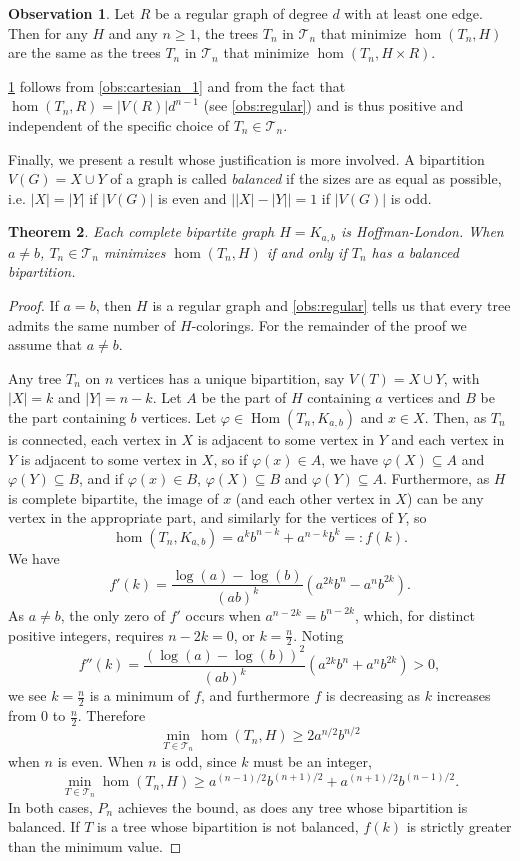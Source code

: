 \documentclass[11pt]{article}
\newtheorem{theorem}{Theorem}[section]
\theoremstyle{definition}
\newtheorem{observation}[theorem]{Observation}
\DeclareMathOperator{\Hom}{Hom}
\begin{document}
\begin{observation} \label{obs:cartesian_2}
Let $R$ be a regular graph of degree $d$ with at least one edge. Then for any $H$ and any $n \ge 1$, the trees $T_n$ in ${\mathcal T_n}$ that minimize $\hom(T_n,H)$ are the same as the trees $T_n$ in ${\mathcal T_n}$ that minimize $\hom(T_n,H \times R)$.
\end{observation}

\cref{obs:cartesian_2} follows from \cref{obs:cartesian_1} and from the fact that $\hom(T_n,R)=|V(R)|d^{n-1}$ (see \cref{obs:regular}) and is thus positive and independent of the specific choice of $T_n \in {\mathcal T}_n$. 

Finally, we present a result whose justification is more involved. A bipartition $V(G) = X \cup Y$ of a graph is called \emph{balanced} if the sizes are as equal as possible, i.e. $|X|= |Y|$ if $|V(G)|$ is even and $\bigl||X|-|Y|\bigr| = 1$ if $|V(G)|$ is odd.
\begin{theorem}\label{thm:complete_bipartite}
Each complete bipartite graph $H=K_{a,b}$ is Hoffman-London. When $a \ne b$, $T_n \in {\mathcal T}_n$ minimizes $\hom(T_n,H)$ if and only if $T_n$ has a balanced bipartition.
\end{theorem}

\begin{proof}
If $a=b$, then $H$ is a regular graph and \cref{obs:regular} tells us that every tree admits the same number of $H$-colorings. For the remainder of the proof we assume that $a \ne b$.

Any tree $T_n$ on $n$ vertices has a unique bipartition, say $V(T) = X \cup Y$, with $|X| = k$ and $|Y| = n-k$. Let $A$ be the part of $H$ containing $a$ vertices and $B$ be the part containing $b$ vertices. Let $\varphi \in \Hom(T_n,K_{a,b})$ and $x \in X$. Then, as $T_n$ is connected, each vertex in $X$ is adjacent to some vertex in $Y$ and each vertex in $Y$ is adjacent to some vertex in $X$, so if $\varphi(x) \in A$, we have $\varphi(X) \subseteq A$ and $\varphi(Y) \subseteq B$, and if $\varphi(x) \in B$, $\varphi(X) \subseteq B$ and $\varphi(Y) \subseteq A$. Furthermore, as $H$ is complete bipartite, the image of $x$ (and each other vertex in $X$) can be any vertex in the appropriate part, and similarly for the vertices of $Y$, so
\[ \hom(T_n,K_{a,b}) = a^kb^{n-k} + a^{n-k}b^k =: f(k).\]
We have
\[ 
f'(k) = \frac{\log(a)-\log(b)}{(ab)^k}(a^{2k}b^n-a^nb^{2k}).
\]
As $a \ne b$, the only zero of $f'$ occurs when $a^{n-2k}=b^{n-2k}$, which, for distinct positive integers, requires $n-2k = 0$, or $k = \frac{n}{2}$. Noting
\[ f''(k) = \frac{(\log(a)-\log(b))^2}{(ab)^k}(a^{2k}b^n+a^nb^{2k}) > 0, \]
we see $k = \frac{n}{2}$ is a minimum of $f$, and furthermore $f$ is decreasing as $k$ increases from $0$ to $\frac{n}{2}$. Therefore
\[
\min_{T \in \mathcal{T}_n} \hom(T_n,H) \ge 2a^{n/2}b^{n/2} 
\]
when $n$ is even. When $n$ is odd, since $k$ must be an integer,
\[
\min_{T \in \mathcal{T}_n} \hom(T_n,H) \ge a^{(n-1)/2}b^{(n+1)/2} + a^{(n+1)/2}b^{(n-1)/2}.
\]
In both cases, $P_n$ achieves the bound, as does any tree whose bipartition is balanced. If $T$ is a tree whose bipartition is not balanced, $f(k)$ is strictly greater than the minimum value.
\end{proof}
\end{document}
